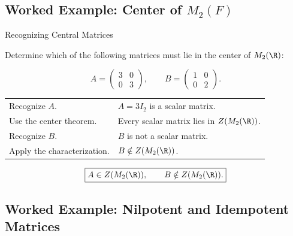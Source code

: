 \subsection{Worked Example: Center of \(M_2(F)\)}
\label{subsec:worked-center-matrix}

\begin{workedexamplebox}{Recognizing Central Matrices}

Determine which of the following matrices must lie in the center of
\(M_2(\R)\):

\[ A=\begin{pmatrix}3&0\\0&3\end{pmatrix},\qquad
B=\begin{pmatrix}1&0\\0&2\end{pmatrix}. \]

\begin{tabularx}{\textwidth}{@{}>{\raggedright\arraybackslash}p{}X@{}}
Recognize \(A\). & \(A=3I_2\) is a scalar matrix.\\
Use the center theorem. & Every scalar matrix lies in \(Z(M_2(\R))\).\\
Recognize \(B\). & \(B\) is not a scalar matrix.\\
Apply the characterization. & \(B\notin Z(M_2(\R))\).
\end{tabularx}

\begin{answerbox}
\[ \boxed{A\in Z(M_2(\R)),\qquad B\notin Z(M_2(\R)).} \]
\end{answerbox}
\end{workedexamplebox}

\subsection{Worked Example: Nilpotent and Idempotent Matrices}
\label{subsec:worked-nilpotent-idempotent}

